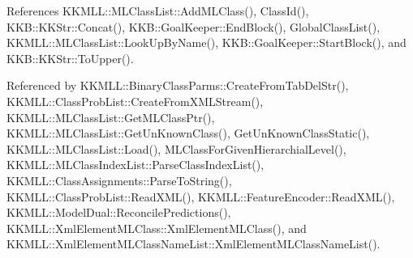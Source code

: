 References K\+K\+M\+L\+L\+::\+M\+L\+Class\+List\+::\+Add\+M\+L\+Class(), Class\+Id(), K\+K\+B\+::\+K\+K\+Str\+::\+Concat(), K\+K\+B\+::\+Goal\+Keeper\+::\+End\+Block(), Global\+Class\+List(), K\+K\+M\+L\+L\+::\+M\+L\+Class\+List\+::\+Look\+Up\+By\+Name(), K\+K\+B\+::\+Goal\+Keeper\+::\+Start\+Block(), and K\+K\+B\+::\+K\+K\+Str\+::\+To\+Upper().



Referenced by K\+K\+M\+L\+L\+::\+Binary\+Class\+Parms\+::\+Create\+From\+Tab\+Del\+Str(), K\+K\+M\+L\+L\+::\+Class\+Prob\+List\+::\+Create\+From\+X\+M\+L\+Stream(), K\+K\+M\+L\+L\+::\+M\+L\+Class\+List\+::\+Get\+M\+L\+Class\+Ptr(), K\+K\+M\+L\+L\+::\+M\+L\+Class\+List\+::\+Get\+Un\+Known\+Class(), Get\+Un\+Known\+Class\+Static(), K\+K\+M\+L\+L\+::\+M\+L\+Class\+List\+::\+Load(), M\+L\+Class\+For\+Given\+Hierarchial\+Level(), K\+K\+M\+L\+L\+::\+M\+L\+Class\+Index\+List\+::\+Parse\+Class\+Index\+List(), K\+K\+M\+L\+L\+::\+Class\+Assignments\+::\+Parse\+To\+String(), K\+K\+M\+L\+L\+::\+Class\+Prob\+List\+::\+Read\+X\+M\+L(), K\+K\+M\+L\+L\+::\+Feature\+Encoder\+::\+Read\+X\+M\+L(), K\+K\+M\+L\+L\+::\+Model\+Dual\+::\+Reconcile\+Predictions(), K\+K\+M\+L\+L\+::\+Xml\+Element\+M\+L\+Class\+::\+Xml\+Element\+M\+L\+Class(), and K\+K\+M\+L\+L\+::\+Xml\+Element\+M\+L\+Class\+Name\+List\+::\+Xml\+Element\+M\+L\+Class\+Name\+List().


